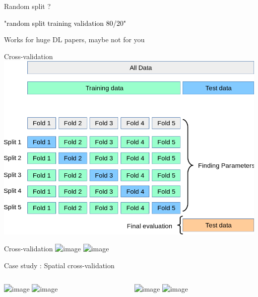 \documentclass{irdbeamer}
\let\oldcite=\cite
\renewcommand{\cite}[1]{\textcolor[rgb]{.5,.5,.7}{\oldcite{#1}}}
\begin{document}
\begin{frame}{Random split ?}
    \begin{center}
    \textcolor{black}{"random split training validation 80/20"}
    \end{center}

    \pause
    
        \centering
        \vspace{-0.5cm}

            \cite{oquab2023dinov2}
    
    \pause
    Works for huge DL papers, maybe not for you
\end{frame}

\begin{frame}{Cross-validation}
    \centering
    \includegraphics[width=.5\textwidth]{./figs/cross_validation.png}
\end{frame}

\begin{frame}{Cross-validation}
    \centering
    \includegraphics<1>[width=.7\textwidth]{./figs/kfold.png}%
    \includegraphics<2>[width=.7\textwidth]{./figs/stratified_kfold.png}%
\end{frame}

\begin{frame}{Case study : Spatial cross-validation}
    \begin{columns}
        \begin{column}{.5\linewidth}
            \centering
    \includegraphics<1-3>[width=.5\textwidth]{./figs/spatial/2022.png}%
    \includegraphics<4>[width=.5\textwidth]{./figs/spatial/2022_pleiades.png}%
        \end{column}
        \begin{column}{.5\linewidth}
            \centering
    \includegraphics<2>[width=.5\textwidth]{./figs/spatial/vit_dino_4cl.png}%
    \includegraphics<3->[width=.5\textwidth]{./figs/spatial/resnet_dino.png}%
        \end{column}
    \end{columns}
\end{frame}
\end{document}
